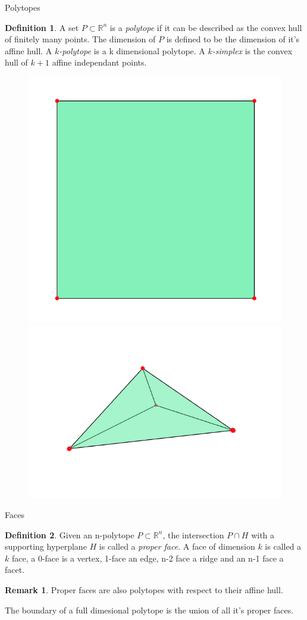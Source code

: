 \documentclass[9pt]{beamer}
\theoremstyle{definition}
\newtheorem{remark}{Remark}
\newtheorem{defn}{Definition}
\begin{document}
\begin{frame}[fragile]{Polytopes}
  \begin{defn}
    A set $P \subset \mathbb{R}^n$ is a \emph{polytope} if it can be described
    as the convex hull of finitely many points. The dimension of $P$ is
    defined to be the dimension of it's affine hull. A \emph{$k$-polytope} is a
    k dimensional polytope. A \emph{$k$-simplex} is the convex hull of $k + 1$
    affine independant points.
  \end{defn}

  \begin{figure}
    \includegraphics[width=.30\textwidth, height=0.4\textheight]{images/square}
    \includegraphics[width=.30\textwidth, height=0.4\textheight]{images/simplex}
  \end{figure}

\end{frame}


\begin{frame}[fragile]{Faces}
  \begin{defn}
    Given an n-polytope $P \subset \mathbb{R}^n$, the intersection $P \cap H$
    with a supporting hyperplane $H$ is called a \emph{proper face}. A face of
    dimension $k$ is called a $k$ face, a 0-face is a vertex, 1-face an edge,
    n-2 face a ridge and an n-1 face a facet.
  \end{defn}
  \begin{remark}
    Proper faces are also polytopes with respect to their affine hull.
  \end{remark}
  \begin{theorem}
    The boundary of a full dimesional polytope is the union of all it's
    proper faces.
  \end{theorem}

\end{frame}
\end{document}

